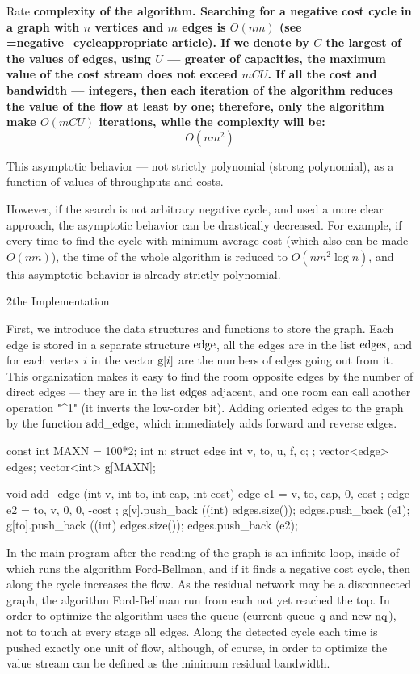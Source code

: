 Rate \bf{complexity} of the algorithm. Searching for a negative cost cycle in a graph with $n$ vertices and $m$ edges is $O(nm)$ (see \algohref=negative_cycle{appropriate article}). If we denote by $C$ the largest of the values of edges, using $U$ --- greater of capacities, the maximum value of the cost stream does not exceed $mCU$. If all the cost and bandwidth --- integers, then each iteration of the algorithm reduces the value of the flow at least by one; therefore, only the algorithm make $O(mCU)$ iterations, while the complexity will be:
$$ O(nm^2) $$

This asymptotic behavior --- not strictly polynomial (strong polynomial), as a function of values of throughputs and costs.

However, if the search is not arbitrary negative cycle, and used a more clear approach, the asymptotic behavior can be drastically decreased. For example, if every time to find the cycle with minimum average cost (which also can be made $O(nm)$), the time of the whole algorithm is reduced to $O(nm^2 \log n)$, and this asymptotic behavior is already strictly polynomial.

\h2{the Implementation}

First, we introduce the data structures and functions to store the graph. Each edge is stored in a separate structure $\rm edge$, all the edges are in the list $\rm edges$, and for each vertex $i$ in the vector ${\rm g}[i]$ are the numbers of edges going out from it. This organization makes it easy to find the room opposite edges by the number of direct edges --- they are in the list $\rm edges$ adjacent, and one room can call another operation "^1" (it inverts the low-order bit). Adding oriented edges to the graph by the function $\rm add\_edge$, which immediately adds forward and reverse edges.

\code
const int MAXN = 100*2;
int n;
struct edge {
int v, to, u, f, c;
};
vector<edge> edges;
vector<int> g[MAXN];

void add_edge (int v, int to, int cap, int cost) {
edge e1 = { v, to, cap, 0, cost };
edge e2 = { to, v, 0, 0, -cost };
g[v].push_back ((int) edges.size());
edges.push_back (e1);
g[to].push_back ((int) edges.size());
edges.push_back (e2);
}
\endcode

In the main program after the reading of the graph is an infinite loop, inside of which runs the algorithm Ford-Bellman, and if it finds a negative cost cycle, then along the cycle increases the flow. As the residual network may be a disconnected graph, the algorithm Ford-Bellman run from each not yet reached the top. In order to optimize the algorithm uses the queue (current queue $\rm q$ and new $\rm nq$), not to touch at every stage all edges. Along the detected cycle each time is pushed exactly one unit of flow, although, of course, in order to optimize the value stream can be defined as the minimum residual bandwidth.

